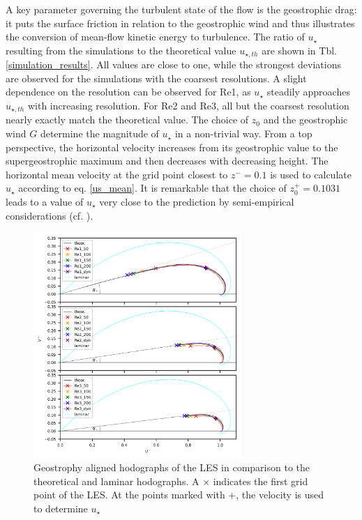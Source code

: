\documentclass[a4paper,11pt]{article}
\begin{document}
A key parameter governing the turbulent state of the flow is the geostrophic drag: it puts the surface friction in relation to the geostrophic wind and thus illustrates the conversion of mean-flow kinetic energy to turbulence. The ratio of $u_{\star}$ resulting from the simulations to the theoretical value $u_{\star,th}$ are shown in Tbl. \ref{simulation_results}. All values are close to one, while the strongest deviations are observed for the simulations with the coarsest resolutions. A slight dependence on the resolution can be observed for Re1, as $u_\star$ steadily approaches $u_{\star,th}$ with increasing resolution. For Re2 and Re3, all but the coarsest resolution nearly exactly match the theoretical value. The choice of $z_0$ and the geostrophic wind $G$ determine the magnitude of $u_\star$ in a non-trivial way. From a top perspective, the horizontal velocity increases from its geostrophic value to the supergeostrophic maximum and then decreases with decreasing height. The horizontal mean velocity at the grid point closest to $z^-=0.1$ is used to calculate $u_\star$ according to eq. \ref{us_mean}. It is remarkable that the choice of $z_0^+=0.1031$ leads to a value of $u_{\star}$ very close to the prediction by semi-empirical considerations (cf. \cite{spalart1989theoretical}).

\begin{figure}[ht]
	\centering
	\includegraphics[width=0.7\textwidth]{figures_2024/d3y_3Re_hodograph}
  \caption{Geostrophy aligned hodographs of the LES in comparison to the theoretical and laminar hodographs. A $\times$ indicates the first grid point of the LES. At the points marked with $+$, the velocity is used to determine $u_\star$}
  \label{3Re_hodograph}
\end{figure}
\end{document}
